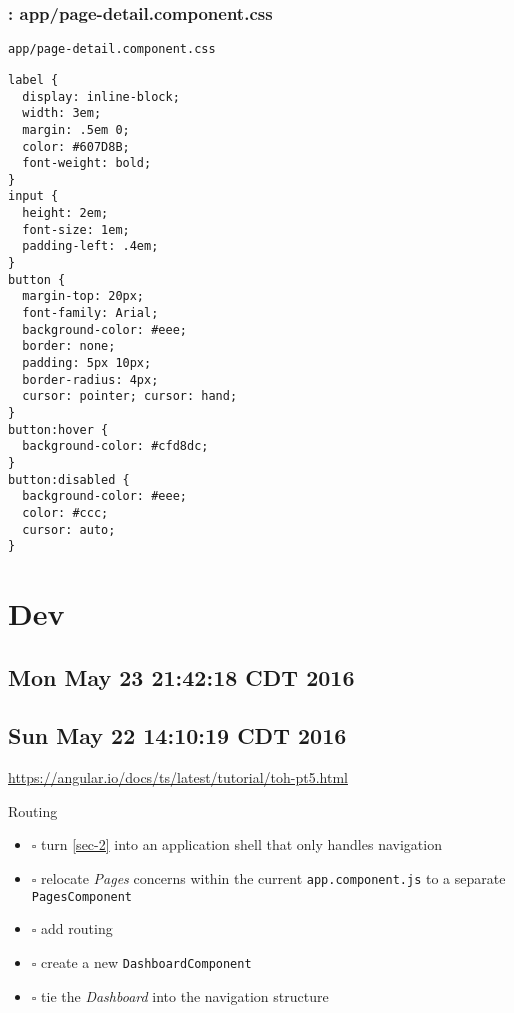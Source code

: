 \documentclass[11pt]{article}
\begin{document}
\subsubsection{: app/page-detail.component.css}
\label{sec-4-4-2}
\begin{verbatim}
app/page-detail.component.css
\end{verbatim}
\begin{verbatim}
label {
  display: inline-block;
  width: 3em;
  margin: .5em 0;
  color: #607D8B;
  font-weight: bold;
}
input {
  height: 2em;
  font-size: 1em;
  padding-left: .4em;
}
button {
  margin-top: 20px;
  font-family: Arial;
  background-color: #eee;
  border: none;
  padding: 5px 10px;
  border-radius: 4px;
  cursor: pointer; cursor: hand;
}
button:hover {
  background-color: #cfd8dc;
}
button:disabled {
  background-color: #eee;
  color: #ccc; 
  cursor: auto;
}
\end{verbatim}

\section{Dev}
\label{sec-5}

\subsection{Mon May 23 21:42:18 CDT 2016}
\label{sec-5-1}



\subsection{Sun May 22 14:10:19 CDT 2016}
\label{sec-5-2}

\url{https://angular.io/docs/ts/latest/tutorial/toh-pt5.html}

Routing

\begin{itemize}
\item $\square$ turn \ref{sec-2} into an application shell that only handles navigation
\item $\square$ relocate \emph{Pages} concerns within the current \texttt{app.component.js} to a separate
\texttt{PagesComponent}
\item $\square$ add routing
\item $\square$ create a new \texttt{DashboardComponent}
\item $\square$ tie the \emph{Dashboard} into the navigation structure
\end{itemize}
\end{document}
